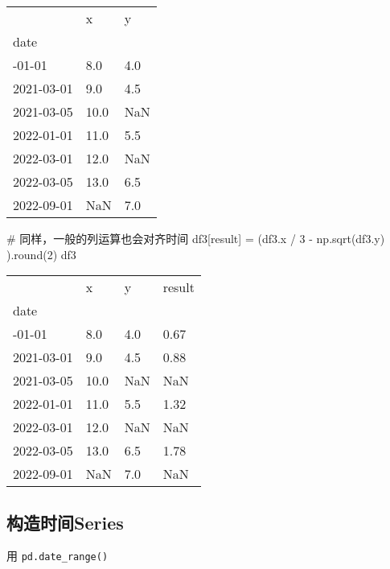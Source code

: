 \documentclass[
  letterpaper,
  DIV=11,
  numbers=noendperiod]{scrreprt}
\newenvironment{Shaded}{\begin{snugshade}}{\end{snugshade}}
\newcommand{\BuiltInTok}[1]{\textcolor[rgb]{0.00,0.23,0.31}{#1}}
\newcommand{\CommentTok}[1]{\textcolor[rgb]{0.37,0.37,0.37}{#1}}
\newcommand{\DecValTok}[1]{\textcolor[rgb]{0.68,0.00,0.00}{#1}}
\newcommand{\NormalTok}[1]{\textcolor[rgb]{0.00,0.23,0.31}{#1}}
\newcommand{\OperatorTok}[1]{\textcolor[rgb]{0.37,0.37,0.37}{#1}}
\newcommand{\StringTok}[1]{\textcolor[rgb]{0.13,0.47,0.30}{#1}}
\begin{document}
\begin{longtable}[]{@{}lll@{}}
\toprule\noalign{}
& x & y \\
date & & \\
\midrule\noalign{}
\endhead
\bottomrule\noalign{}
\endlastfoot
2021-01-01 & 8.0 & 4.0 \\
2021-03-01 & 9.0 & 4.5 \\
2021-03-05 & 10.0 & NaN \\
2022-01-01 & 11.0 & 5.5 \\
2022-03-01 & 12.0 & NaN \\
2022-03-05 & 13.0 & 6.5 \\
2022-09-01 & NaN & 7.0 \\
\end{longtable}

\begin{Shaded}
\begin{Highlighting}[]
\CommentTok{\# 同样，一般的列运算也会对齐时间}
\NormalTok{df3[}\StringTok{\textquotesingle{}result\textquotesingle{}}\NormalTok{] }\OperatorTok{=}\NormalTok{ (df3.x }\OperatorTok{/} \DecValTok{3} \OperatorTok{{-}}\NormalTok{ np.sqrt(df3.y) ).}\BuiltInTok{round}\NormalTok{(}\DecValTok{2}\NormalTok{)}
\NormalTok{df3}
\end{Highlighting}
\end{Shaded}

\begin{longtable}[]{@{}llll@{}}
\toprule\noalign{}
& x & y & result \\
date & & & \\
\midrule\noalign{}
\endhead
\bottomrule\noalign{}
\endlastfoot
2021-01-01 & 8.0 & 4.0 & 0.67 \\
2021-03-01 & 9.0 & 4.5 & 0.88 \\
2021-03-05 & 10.0 & NaN & NaN \\
2022-01-01 & 11.0 & 5.5 & 1.32 \\
2022-03-01 & 12.0 & NaN & NaN \\
2022-03-05 & 13.0 & 6.5 & 1.78 \\
2022-09-01 & NaN & 7.0 & NaN \\
\end{longtable}

\hypertarget{ux6784ux9020ux65f6ux95f4series}{%
\subsection{构造时间Series}\label{ux6784ux9020ux65f6ux95f4series}}

用 \texttt{pd.date\_range()}
\end{document}
